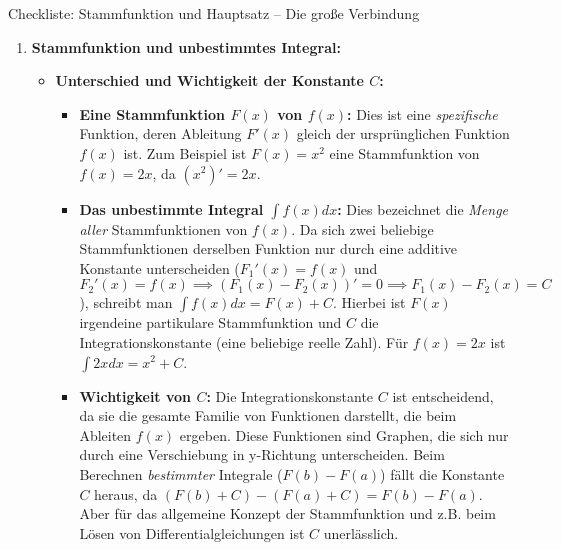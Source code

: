 \begin{loesungsumgebung}{Checkliste: Stammfunktion und Hauptsatz – Die große Verbindung}

\begin{enumerate}[label=(\alph*)]
    \item \textbf{Stammfunktion und unbestimmtes Integral:}
    \begin{itemize}
        \item \textbf{Unterschied und Wichtigkeit der Konstante $C$:}
        \begin{itemize}
            \item \textbf{Eine Stammfunktion $F(x)$ von $f(x)$:} Dies ist eine \textit{spezifische} Funktion, deren Ableitung $F'(x)$ gleich der ursprünglichen Funktion $f(x)$ ist. Zum Beispiel ist $F(x) = x^2$ eine Stammfunktion von $f(x)=2x$, da $(x^2)' = 2x$.
            \item \textbf{Das unbestimmte Integral $\int f(x)dx$:} Dies bezeichnet die \textit{Menge aller} Stammfunktionen von $f(x)$. Da sich zwei beliebige Stammfunktionen derselben Funktion nur durch eine additive Konstante unterscheiden ($F_1'(x) = f(x)$ und $F_2'(x) = f(x) \implies (F_1(x)-F_2(x))' = 0 \implies F_1(x)-F_2(x)=C$), schreibt man $\int f(x)dx = F(x) + C$. Hierbei ist $F(x)$ irgendeine partikulare Stammfunktion und $C$ die Integrationskonstante (eine beliebige reelle Zahl). Für $f(x)=2x$ ist $\int 2x dx = x^2 + C$.
            \item \textbf{Wichtigkeit von $C$:} Die Integrationskonstante $C$ ist entscheidend, da sie die gesamte Familie von Funktionen darstellt, die beim Ableiten $f(x)$ ergeben. Diese Funktionen sind Graphen, die sich nur durch eine Verschiebung in y-Richtung unterscheiden. Beim Berechnen \textit{bestimmter} Integrale ($F(b)-F(a)$) fällt die Konstante $C$ heraus, da $(F(b)+C) - (F(a)+C) = F(b)-F(a)$. Aber für das allgemeine Konzept der Stammfunktion und z.B. beim Lösen von Differentialgleichungen ist $C$ unerlässlich.
        \end{itemize}


\end{itemize}
\end{enumerate}
\end{loesungsumgebung}
